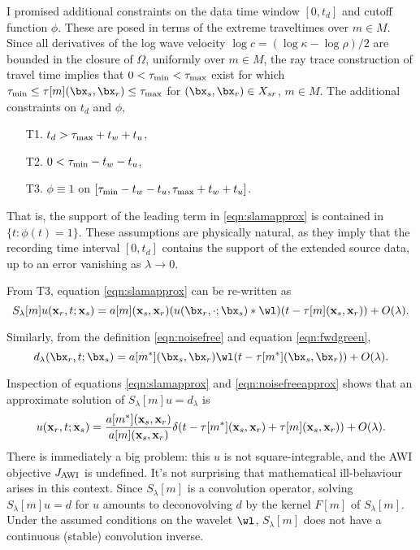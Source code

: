 I promised additional constraints on the data time window $[0,t_d]$
and cutoff function $\phi$. These are posed in terms of the extreme
traveltimes over $m \in M$. Since all derivatives of the log wave velocity $\log c =
(\log \kappa - \log \rho )/2$ are bounded in the closure of $\Omega$,
uniformly over $m \in M$, 
the ray trace construction of travel time implies that
$0 < \tau_{\rm min} < \tau_{\rm max}$ exist for which $\tau_{\rm min}
\le \tau[m](\bx_s,\bx_r) \le \tau_{\rm max}$ for $(\bx_s,\bx_r) \in
X_{sr}$, $m \in M$.
The additional constraints on $t_d$ and $\phi$,
\begin{itemize}
\item[T1. ] $t_d >  \tau_{\rm max} + t_w + t_u $,
\item[T2. ] $0 < \tau_{\rm min} - t_w - t_u$,
\item[T3. ] $\phi \equiv 1$ on $[\tau_{\rm min} - t_w - t_u,
\tau_{\rm max} + t_w + t_u]$.
\end{itemize}
That is, the support of the leading term in \ref{eqn:slamapprox} is
contained in $\{t: \phi(t) = 1\}$. These assumptions are physically natural, as
they imply that the recording time interval $[0,t_d]$ contains the
support of the extended source data, up to an error vanishing as
$\lambda \rightarrow 0$.

From T3, equation \ref{eqn:slamapprox} can be re-written as
\begin{equation}
  \label{eqn:slambis}
  S_{\lambda}[m]u({\bf x}_r,t;{\bf x}_s) = a[m]({\bf x}_s,{\bf
    x}_r) (u(\bx_r,\cdot;\bx_s)*\wl)(t-\tau[m]({\bf x}_s,{\bf x}_r)) + O(\lambda).
\end{equation}

Similarly, from the definition \ref{eqn:noisefree} and equation
\ref{eqn:fwdgreen},
\begin{equation}
  \label{eqn:noisefreeapprox}
  d_{\lambda}(\bx_r,t;\bx_s) = a[m^*](\bx_s,\bx_r) \wl(t-\tau[m^*](\bx_s,\bx_r)) + O(\lambda).
  \end{equation}

Inspection of equations \ref{eqn:slamapprox} and
\ref{eqn:noisefreeapprox} shows that an approximate solution of $S_{\lambda}[m]u=d_{\lambda}$ is 
\begin{equation}
  \label{eqn:notl2}
  u({\bf x}_r,t;{\bf x}_s) = \frac{a[m^*]({\bf x}_s,{\bf
      x}_r)}{a[m]({\bf x}_s,{\bf x}_r)}\delta(t-\tau[m^*]({\bf
    x}_s,{\bf x}_r)+\tau[m]({\bf x}_s,{\bf x}_r)) + O(\lambda).
\end{equation}
There is immediately a big problem: this $u$ is not
square-integrable, and the AWI objective $J_{\rm AWI}$ is
undefined. It's not surprising that mathematical ill-behaviour arises
in this context. Since $S_{\lambda}[m]$ is a convolution operator, solving
$S_{\lambda}[m]u=d$ for $u$ amounts to deconovolving $d$ by the kernel $F[m]$ of
$S_{\lambda}[m]$. Under the assumed conditions on the wavelet $\wl$, $S_{\lambda}[m]$ does
not have a continuous (stable) convolution inverse.


